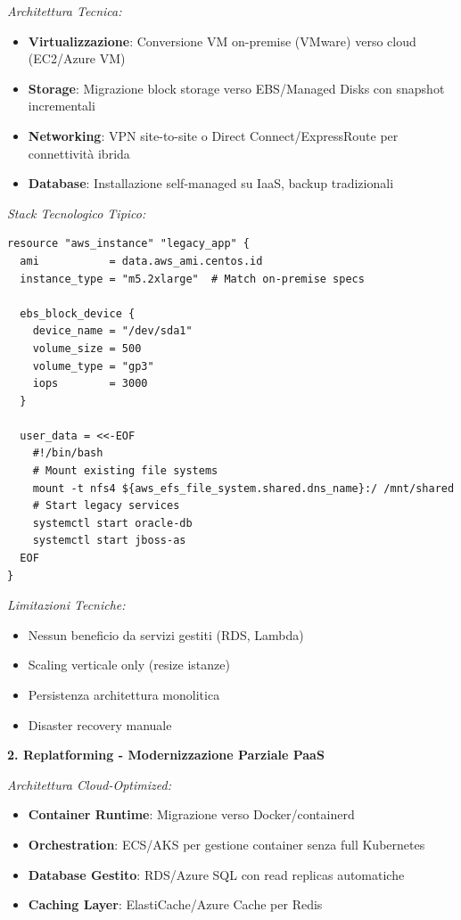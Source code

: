 \textit{Architettura Tecnica:}
\begin{itemize}
    \item \textbf{Virtualizzazione}: Conversione VM on-premise (VMware) verso cloud (EC2/Azure VM)
    \item \textbf{Storage}: Migrazione block storage verso EBS/Managed Disks con snapshot incrementali
    \item \textbf{Networking}: VPN site-to-site o Direct Connect/ExpressRoute per connettività ibrida
    \item \textbf{Database}: Installazione self-managed su IaaS, backup tradizionali
\end{itemize}

\textit{Stack Tecnologico Tipico:}
\begin{lstlisting}[caption={Terraform per Lift-and-Shift},label={lst:lift_shift}]
resource "aws_instance" "legacy_app" {
  ami           = data.aws_ami.centos.id
  instance_type = "m5.2xlarge"  # Match on-premise specs
  
  ebs_block_device {
    device_name = "/dev/sda1"
    volume_size = 500
    volume_type = "gp3"
    iops        = 3000
  }
  
  user_data = <<-EOF
    #!/bin/bash
    # Mount existing file systems
    mount -t nfs4 ${aws_efs_file_system.shared.dns_name}:/ /mnt/shared
    # Start legacy services
    systemctl start oracle-db
    systemctl start jboss-as
  EOF
}
\end{lstlisting}

\textit{Limitazioni Tecniche:}
\begin{itemize}
    \item Nessun beneficio da servizi gestiti (RDS, Lambda)
    \item Scaling verticale only (resize istanze)
    \item Persistenza architettura monolitica
    \item Disaster recovery manuale
\end{itemize}

\textbf{2. Replatforming - Modernizzazione Parziale PaaS}

\textit{Architettura Cloud-Optimized:}
\begin{itemize}
    \item \textbf{Container Runtime}: Migrazione verso Docker/containerd
    \item \textbf{Orchestration}: ECS/AKS per gestione container senza full Kubernetes
    \item \textbf{Database Gestito}: RDS/Azure SQL con read replicas automatiche
    \item \textbf{Caching Layer}: ElastiCache/Azure Cache per Redis
\end{itemize}

